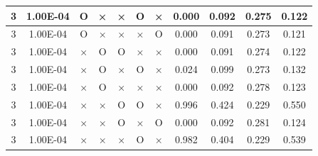 \documentclass[11pt]{article}
\begin{document}
\begin{longtable}[h]{|r|r|l|l|l|l|l|r|r|l|r|}
\multicolumn{1}{|c|}{3} & \multicolumn{1}{c|}{1.00E-04} & \multicolumn{1}{c|}{O} & \multicolumn{1}{c|}{×} & \multicolumn{1}{c|}{×} & \multicolumn{1}{c|}{O} & \multicolumn{1}{c|}{×} & \multicolumn{1}{c|}{0.000} & \multicolumn{1}{c|}{0.092} & \multicolumn{1}{c|}{0.275} & \multicolumn{1}{c|}{0.122} \\ \hline
\multicolumn{1}{|c|}{3} & \multicolumn{1}{c|}{1.00E-04} & \multicolumn{1}{c|}{O} & \multicolumn{1}{c|}{×} & \multicolumn{1}{c|}{×} & \multicolumn{1}{c|}{×} & \multicolumn{1}{c|}{O} & \multicolumn{1}{c|}{0.000} & \multicolumn{1}{c|}{0.091} & \multicolumn{1}{c|}{0.273} & \multicolumn{1}{c|}{0.121} \\ \hline
\multicolumn{1}{|c|}{3} & \multicolumn{1}{c|}{1.00E-04} & \multicolumn{1}{c|}{×} & \multicolumn{1}{c|}{O} & \multicolumn{1}{c|}{O} & \multicolumn{1}{c|}{×} & \multicolumn{1}{c|}{×} & \multicolumn{1}{c|}{0.000} & \multicolumn{1}{c|}{0.091} & \multicolumn{1}{c|}{0.274} & \multicolumn{1}{c|}{0.122} \\ \hline
\multicolumn{1}{|c|}{3} & \multicolumn{1}{c|}{1.00E-04} & \multicolumn{1}{c|}{×} & \multicolumn{1}{c|}{O} & \multicolumn{1}{c|}{×} & \multicolumn{1}{c|}{O} & \multicolumn{1}{c|}{×} & \multicolumn{1}{c|}{0.024} & \multicolumn{1}{c|}{0.099} & \multicolumn{1}{c|}{0.273} & \multicolumn{1}{c|}{0.132} \\ \hline
\multicolumn{1}{|c|}{3} & \multicolumn{1}{c|}{1.00E-04} & \multicolumn{1}{c|}{×} & \multicolumn{1}{c|}{O} & \multicolumn{1}{c|}{×} & \multicolumn{1}{c|}{×} & \multicolumn{1}{c|}{×} & \multicolumn{1}{c|}{0.000} & \multicolumn{1}{c|}{0.092} & \multicolumn{1}{c|}{0.278} & \multicolumn{1}{c|}{0.123} \\ \hline
\multicolumn{1}{|c|}{3} & \multicolumn{1}{c|}{1.00E-04} & \multicolumn{1}{c|}{×} & \multicolumn{1}{c|}{×} & \multicolumn{1}{c|}{O} & \multicolumn{1}{c|}{O} & \multicolumn{1}{c|}{×} & \multicolumn{1}{c|}{0.996} & \multicolumn{1}{c|}{0.424} & \multicolumn{1}{c|}{0.229} & \multicolumn{1}{c|}{0.550} \\ \hline
\multicolumn{1}{|c|}{3} & \multicolumn{1}{c|}{1.00E-04} & \multicolumn{1}{c|}{×} & \multicolumn{1}{c|}{×} & \multicolumn{1}{c|}{O} & \multicolumn{1}{c|}{×} & \multicolumn{1}{c|}{O} & \multicolumn{1}{c|}{0.000} & \multicolumn{1}{c|}{0.092} & \multicolumn{1}{c|}{0.281} & \multicolumn{1}{c|}{0.124} \\ \hline
\multicolumn{1}{|c|}{3} & \multicolumn{1}{c|}{1.00E-04} & \multicolumn{1}{c|}{×} & \multicolumn{1}{c|}{×} & \multicolumn{1}{c|}{×} & \multicolumn{1}{c|}{O} & \multicolumn{1}{c|}{×} & \multicolumn{1}{c|}{0.982} & \multicolumn{1}{c|}{0.404} & \multicolumn{1}{c|}{0.229} & \multicolumn{1}{c|}{0.539} \\ \hline

\end{longtable}
\end{document}
